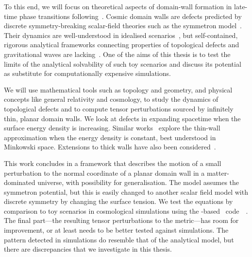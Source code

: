 To this end, we will focus on theoretical aspects of domain-wall formation in late-time phase transitions following~\citet{christiansenGravitationalWavesDark2024,christiansenAsimulationDomainFormation2024}. Cosmic domain walls are defects predicted by discrete symmetry-breaking scalar-field theories such as the symmetron model~\citep{hinterbichlerSymmetronCosmology2011}. Their dynamics are well-understood in idealised scenarios~\citep{vachaspatiKinksDomainWalls2006,blanco-pilladoDynamicsDomainWall2023,guvenPerturbationsTopologicalDefect1993,garrigaPerturbationsDomainWalls1991,ishibashiEquationMotionDomain1999}, but self-contained, rigorous analytical frameworks connecting properties of topological defects and gravitational waves are lacking~\citep{saikawaReviewGravitationalWaves2017}. One of the aims of this thesis is to test the limits of the analytical solvability of such toy scenarios and discuss its potential as substitute for computationally expensive simulations. 














We will use mathematical tools such as topology and geometry, and physical concepts like general relativity and cosmology, to study the dynamics of topological defects and to compute tensor perturbations sourced by infinitely thin, planar domain walls. 
We look at defects in expanding spacetime when the surface energy density is increasing. %
Similar works~\cite{blanco-pilladoDynamicsDomainWall2023,ishibashiEquationMotionDomain1999,garrigaPerturbationsDomainWalls1991} explore the thin-wall approximation when the energy density is constant, best understood in Minkowski space. %
Extensions to thick walls have also been considered~\citep{cuttingGravitationalWavesVacuum2021}. %



This work concludes in a framework that describes the motion of a small perturbation to the normal coordinate of a planar domain wall in a matter-dominated universe, with possibility for generalisation. 
The model assumes the symmetron potential, but this is easily changed to another scalar field model with discrete symmetry by changing the surface tension. 
We test the equations by comparison to toy scenarios in cosmological simulations using the \gevolution-based~\citep{adamekGeneralRelativityCosmic2016} code~\asgrd~\citep{christiansenGravitationalWavesDark2024}. %
The final part---the resulting tensor perturbations to the metric---has room for improvement, or at least needs to be better tested against simulations. The pattern detected in simulations do resemble that of the analytical model, but there are discrepancies that we investigate in this thesis.



